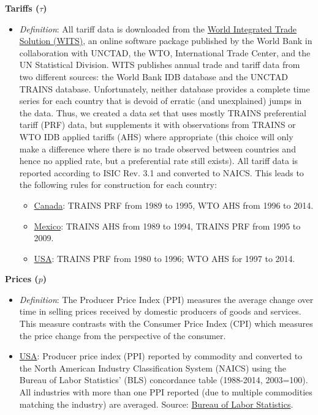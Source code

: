 
\begin{spacing}{1}

\noindent \textbf{Tariffs ($\tau$)}
	\begin{itemize}
	
	\item \emph{Definition}: All tariff data is downloaded from the \href{http://wits.worldbank.org/Default.aspx}{World Integrated Trade Solution (WITS)}, an online software package published by the World Bank in collaboration with UNCTAD, the WTO, International Trade Center, and the UN Statistical Division. WITS publishes annual trade and tariff data from two different sources: the World Bank IDB database and the UNCTAD TRAINS database. Unfortunately, neither database provides a complete time series for each country that is devoid of erratic (and unexplained) jumps in the data. Thus, we created a data set that uses mostly TRAINS preferential tariff (PRF) data, but supplements it with observations from TRAINS or WTO IDB applied tariffs (AHS) where appropriate (this choice will only make a difference where there is no trade observed between countries and hence no applied rate, but a preferential rate still exists). All tariff data is reported according to ISIC Rev. 3.1 and converted to NAICS. This leads to the following rules for construction for each country:
		\begin{itemize}
		\item \underline{Canada}: TRAINS PRF from 1989 to 1995, WTO AHS from 1996 to 2014.

		\item \underline{Mexico}: TRAINS AHS from 1989 to 1994, TRAINS PRF from 1995 to 2009.

		\item \underline{USA}: TRAINS PRF from 1980 to 1996; WTO AHS for 1997 to 2014.
		\end{itemize}
	\end{itemize}


\noindent \textbf{Prices ($p$)}
	\begin{itemize}
	
	\item \emph{Definition}: The Producer Price Index (PPI) measures the average change over time in selling prices received by domestic producers of goods and services. This measure contrasts with the Consumer Price Index (CPI) which measures the price change from the perspective of the consumer. 
	
	\item \underline{USA}: Producer price index (PPI) reported by commodity and converted to the North American Industry Classification System (NAICS) using the Bureau of Labor Statistics' (BLS) concordance table (1988-2014, 2003=100). All industries with more than one PPI reported (due to multiple commodities matching the industry) are averaged. Source: \href{http://www.bls.gov/ppi/#data}{Bureau of Labor Statistics}. %
		

\end{itemize}
\end{spacing}
